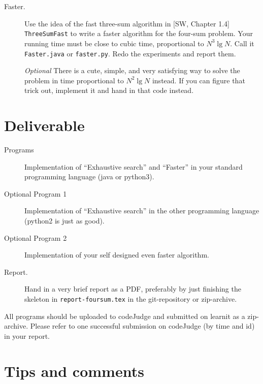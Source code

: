\documentclass{tufte-handout}
\begin{document}
\begin{description}
\item[Faster.]
  Use the idea of the fast three-sum algorithm in [SW, Chapter 1.4] \texttt{
  ThreeSumFast} to write a faster algorithm for the four-sum problem.
  Your running time must be close to cubic time, proportional to $N^3\operatorname{lg} N$.
  Call it \texttt{Faster.java}  or \texttt{faster.py}.
  Redo the experiments and report them.

  \emph{Optional} There is a cute, simple, and very satisfying way to solve the problem in time proportional to $N^2\operatorname{lg} N$ instead.
If you can figure that trick out, implement it and hand in that code instead.
\end{description}

\section{Deliverable}
\begin{description}
  \item[Programs] Implementation of ``Exhaustive search'' and ``Faster'' in your standard programming language (java or python3).
  \item[Optional Program 1] Implementation of ``Exhaustive search''  in the other programming language (python2 is just as good).
  \item[Optional Program 2] Implementation of your self designed even faster algorithm.
  \item[Report.]
    Hand in a very brief report as a PDF, preferably by just finishing the skeleton in \texttt{report-foursum.tex} in the git-repository or zip-archive. 
\end{description}
All programs should be uploaded to codeJudge and submitted on learnit as a zip-archive.
Please refer to  one successful submission on codeJudge (by time and id) in your report.

\section{Tips and comments}
\end{document}
